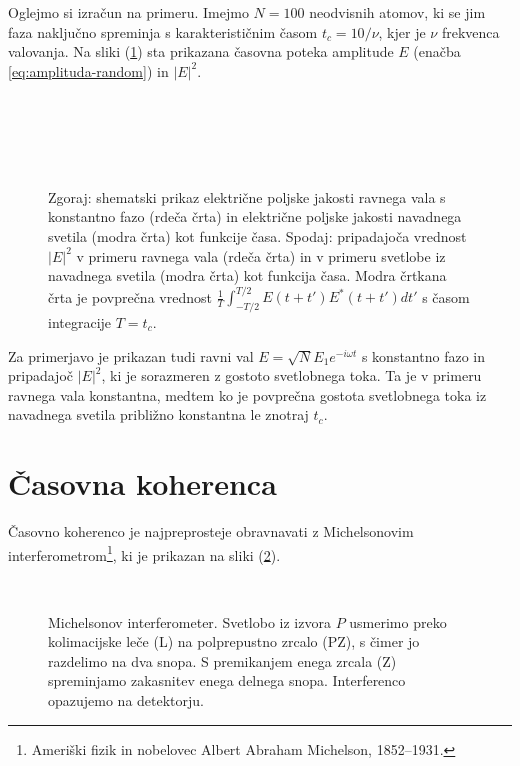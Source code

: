 Oglejmo si izračun
na primeru. Imejmo $N=100$ neodvisnih atomov, ki se jim faza naključno
spreminja s karakterističnim časom $t_{c}=10/\nu$, kjer je $\nu$
frekvenca valovanja. Na sliki (\ref{fig:amplituda-intenziteta}) sta
prikazana časovna poteka amplitude $E$ (enačba \ref{eq:amplituda-random})
in $|E|^{2}$.
\begin{figure}
\centering
\def\svgwidth{150truemm} 
\\
\def\svgwidth{150truemm} 
\\
\def\svgwidth{150truemm} 
\\
\def\svgwidth{150truemm} 
\\
\caption{Zgoraj: shematski prikaz električne poljske jakosti 
ravnega vala s konstantno fazo (rdeča črta) in električne
poljske jakosti navadnega svetila (modra črta) kot funkcije
časa. 
Spodaj: pripadajoča vrednost $|E|^2$ v primeru ravnega vala (rdeča črta) in 
v primeru svetlobe iz navadnega svetila (modra črta) kot funkcija
časa. Modra črtkana črta je povprečna vrednost
$\frac{1}{T}\int_{-T/2}^{T/2}E(t+t')E^{*}(t+t')dt'$
s časom integracije $T=t_{c}$.}
\label{fig:amplituda-intenziteta}
\end{figure}
Za primerjavo je prikazan tudi ravni val $E=\sqrt{N}E_{1}e^{-i\omega t}$
s konstantno fazo in pripadajoč $|E|^{2}$, ki je sorazmeren z gostoto svetlobnega
toka. Ta je v primeru ravnega vala konstantna, medtem ko je povprečna gostota
svetlobnega toka iz navadnega svetila približno konstantna le znotraj $t_{c}$.

\section{Časovna koherenca}
\label{sec:casovna-koherenca}

Časovno koherenco je najpreprosteje obravnavati 
z Michelsonovim 
interferometrom\footnote{Ameriški fizik in nobelovec Albert Abraham Michelson, 1852--1931.},
ki je prikazan na sliki (\ref{fig:michelson}). 
\begin{figure}[!h]
\centering
\def\svgwidth{85truemm} 
\\
\caption{\label{fig:michelson}Michelsonov interferometer. Svetlobo
iz izvora $P$ usmerimo preko kolimacijske leče (L) na polprepustno
zrcalo (PZ), s čimer jo razdelimo na dva snopa. S premikanjem 
enega zrcala (Z) spreminjamo zakasnitev enega delnega snopa.
Interferenco opazujemo na detektorju.}
\end{figure}

